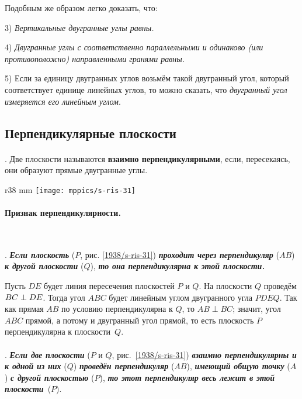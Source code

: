 Подобным же образом легко доказать, что:

3) \emph{Вертикальные двугранные углы равны.}

4) \emph{Двугранные углы с соответственно параллельными и одинаково (или противоположно) направленными гранями равны.}

5) Если за единицу двугранных углов возьмём такой двугранный угол, который соответствует единице линейных углов, то можно сказать, что \emph{двугранный угол измеряется его линейным углом}.


\subsection*{Перпендикулярные плоскости}

\paragraph{}\label{1938/s42}
\mbox{.}
Две плоскости называются \textbf{взаимно перпендикулярными}, если, пересекаясь, они образуют прямые двугранные углы.

\begin{wrapfigure}{r}{38 mm}
\vskip-5mm
\centering
\texttt{[image: mppics/s-ris-31]}
\caption{}\label{1938/s-ris-31}
\end{wrapfigure}

\paragraph{Признак перпендикулярности.}\label{1938/s43}\ 

\mbox{.}
\textbf{\emph{Если плоскость}} ($P$, рис. \ref{1938/s-ris-31}) \textbf{\emph{проходит через перпендикуляр}} ($AB$) \textbf{\emph{к другой плоскости}} ($Q$), \textbf{\emph{то она перпендикулярна к этой плоскости.}}

Пусть $DE$ будет линия пересечения плоскостей $P$ и $Q$.
На плоскости $Q$ проведём $BC \z\perp DE$.
Тогда угол $ABC$ будет линейным углом двугранного угла $PDEQ$.
Так как прямая $AB$ по условию перпендикулярна к $Q$, то $AB\perp BC$;
значит, угол $ABC$ прямой, а потому и двугранный угол прямой, то есть плоскость $P$ перпендикулярна к плоскости~$Q$.

\paragraph{}\label{1938/s44}
.
\textbf{\emph{Если две плоскости}} ($P$ и $Q$, рис.~\ref{1938/s-ris-31}) \textbf{\emph{взаимно перпендикулярны и к одной из них}} ($Q$) \textbf{\emph{проведён перпендикуляр}} ($AB$), \textbf{\emph{имеющий общую точку}} ($A$) \textbf{\emph{с другой плоскостью}} ($P$), \textbf{\emph{то этот перпендикуляр весь лежит в этой плоскости}}~($P$).

